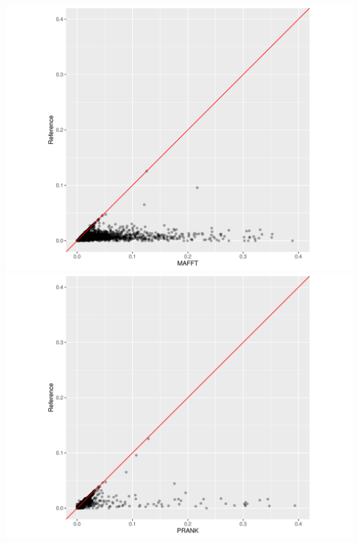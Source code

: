 \documentclass[aspectratio=169,font=14pt]{beamer}
\begin{document}
\begin{frame}[noframenumbering] %
\begin{columns}
        \includegraphics[width = \textwidth, trim={2.5cm 0 3cm 0}, clip]{defense/suppl/MAFFT_ref_distance.png}
        \includegraphics[width = \textwidth, trim={2.5cm 0 3cm 0}, clip]{defense/suppl/PRANK_ref_distance.png}
\end{columns}
\end{frame} %
\end{document}
